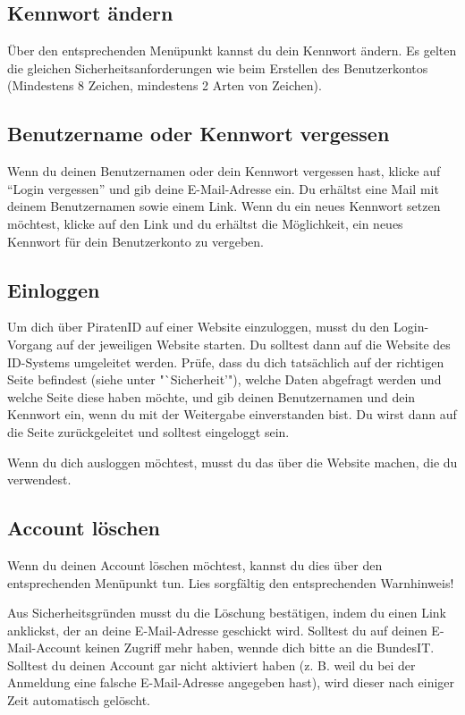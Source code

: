 \subsection{Kennwort ändern}
Über den entsprechenden Menüpunkt kannst du dein Kennwort ändern.
Es gelten die gleichen Sicherheitsanforderungen wie beim Erstellen des Benutzerkontos (Mindestens 8 Zeichen, mindestens 2 Arten von Zeichen).

\subsection{Benutzername oder Kennwort vergessen}
Wenn du deinen Benutzernamen oder dein Kennwort vergessen hast, klicke auf "`Login vergessen"' und gib deine E-Mail-Adresse ein.
Du erhältst eine Mail mit deinem Benutzernamen sowie einem Link.
Wenn du ein neues Kennwort setzen möchtest, klicke auf den Link und du erhältst die Möglichkeit, ein neues Kennwort für dein Benutzerkonto zu vergeben.

\subsection{Einloggen}
Um dich über PiratenID auf einer Website einzuloggen, musst du den Login-Vorgang auf der jeweiligen Website starten.
Du solltest dann auf die Website des ID-Systems umgeleitet werden.
Prüfe, dass du dich tatsächlich auf der richtigen Seite befindest (siehe unter "`Sicherheit'"),
welche Daten abgefragt werden und welche Seite diese haben möchte,
und gib deinen Benutzernamen und dein Kennwort ein, wenn du mit der Weitergabe einverstanden bist.
Du wirst dann auf die Seite zurückgeleitet und solltest eingeloggt sein.

Wenn du dich ausloggen möchtest, musst du das über die Website machen, die du verwendest.

\subsection{Account löschen}
Wenn du deinen Account löschen möchtest, kannst du dies über den entsprechenden Menüpunkt tun.
Lies sorgfältig den entsprechenden Warnhinweis!

Aus Sicherheitsgründen musst du die Löschung bestätigen, indem du einen Link anklickst, der an deine E-Mail-Adresse geschickt wird.
Solltest du auf deinen E-Mail-Account keinen Zugriff mehr haben, wennde dich bitte an die BundesIT.
Solltest du deinen Account gar nicht aktiviert haben (z. B. weil du bei der Anmeldung eine falsche E-Mail-Adresse angegeben hast),
wird dieser nach einiger Zeit automatisch gelöscht.

